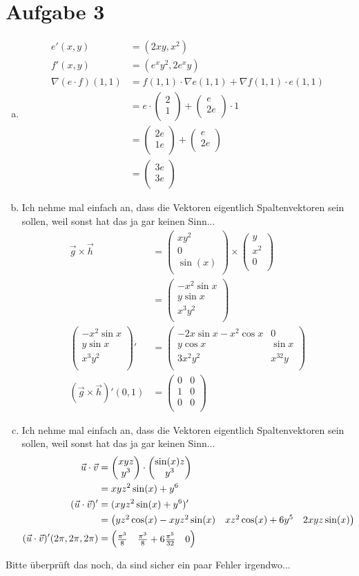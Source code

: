 \documentclass[10pt,a4paper,parskip=half]{scrartcl}
\newcommand{\vectwo}[2]{\begin{pmatrix}#1\\#2\\\end {pmatrix}}
\newcommand{\vecthree}[3]{\begin{pmatrix}#1\\#2\\#3\\\end {pmatrix}}
\begin{document}
\section*{Aufgabe 3}
\begin{enumerate}[(a)]
\item
\begin{align*}
e'(x,y) &= (2xy,x^2) \\
f'(x,y) &= (e^xy^2,2e^xy) \\
\nabla(e\cdot f)(1,1) &= f(1,1) \cdot \nabla e(1,1) + \nabla  f(1,1) \cdot e(1,1) \\
&= e \cdot \vectwo{2}{1} + \vectwo{e}{2e} \cdot 1 \\
&= \vectwo{2e}{1e} + \vectwo{e}{2e} \\
&= \vectwo{3e}{3e}
\end{align*}

\item
Ich nehme mal einfach an, dass die Vektoren eigentlich Spaltenvektoren sein sollen, weil sonst hat das ja gar keinen Sinn...
\begin{align*}
\vec g \times \vec h &= \vecthree{xy^2}{0}{\sin (x)} \times \vecthree{y}{x^2}{0} \\
&= \vecthree{-x^2 \sin x}{y\sin x}{x^3y^2} \\
\vecthree{-x^2 \sin x}{y \sin x}{x^3y^2}' &= 
\begin{pmatrix}
-2x \sin x - x^2 \cos x& 0 \\
y \cos x & \sin x \\
3x^2y^2 & x^32y\\
\end{pmatrix}\\
(\vec g \times \vec h)'(0,1) &= \begin{pmatrix}
0 & 0 \\
1 & 0 \\
0 & 0 \\
\end{pmatrix}
\end{align*}
\item
Ich nehme mal einfach an, dass die Vektoren eigentlich Spaltenvektoren sein sollen, weil sonst hat das ja gar keinen Sinn...
\begin{align*}
\vec u \cdot \vec v &= \vectwo{xyz}{y^3} \cdot \vectwo{\sin(x)z}{y^3} \\
&= xyz^2\sin(x) + y^6 \\
(\vec u \cdot \vec v)' &= (xyz^2\sin(x) + y^6)' \\
&= \begin{pmatrix}
yz^2\cos(x) - xyz^2\sin(x) & xz^2\cos(x) + 6y^5 & 2xyz\sin(x)
\end{pmatrix} \\
(\vec u \cdot \vec v)'(2\pi, 2\pi, 2\pi) &= \begin{pmatrix}\pi^3 \over 8 & \frac{\pi^3}{8} + 6 \frac{\pi^5}{32} & 0\end{pmatrix}
\end{align*}
\end{enumerate}
Bitte überprüft das noch, da sind sicher ein paar Fehler irgendwo...
\end{document}
